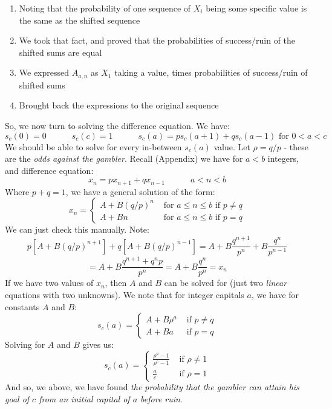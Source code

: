 \documentclass[12pt,a4paper]{article}
\newcommand{\1}[1]{\mathbbm{1}\left\{ #1 \right\}}
\begin{document}
\begin{enumerate}
	\item Noting that the probability of one sequence of $X_i$ being some specific value is the same as the shifted sequence
	\item We took that fact, and proved that the probabilities of success/ruin of the shifted sums are equal
	\item We expressed $A_{a,n}$ as $X_1$ taking a value, times probabilities of success/ruin of shifted sums
	\item Brought back the expressions to the original sequence
\end{enumerate}
So, we now turn to solving the difference equation. We have:
$$
	s_c(0) = 0 \quad\quad\quad s_c(c) = 1 \quad\quad\quad
	s_c(a) = ps_c(a + 1) + qs_c(a - 1) \text{ for $0 < a < c$}
$$
We should be able to solve for every in-between $s_c(a)$ value. Let $\rho = q / p$ - these are the \textit{odds against the gambler}. Recall (Appendix) we have for $a < b$ integers, and difference equation:
$$
	x_n = p x_{n + 1} + q x_{n - 1} \quad\quad\quad a < n < b
$$
Where $p + q = 1$, we have a general solution of the form:
$$
	x_n = \begin{cases}
	A + B(q / p)^n & \text{ for $a \leq n \leq b$ if $p \neq q$}\\
	A + Bn & \text{ for $a \leq n \leq b$ if $p = q$}
	\end{cases}
$$
We can just check this manually. Note:
$$
	p \left[A + B(q / p)^{n + 1}\right] + q \left[A + B(q / p)^{n - 1}\right] =
	A + B \frac{q^{n+1}}{p^n} + B \frac{q^n}{p^{n-1}}
$$
$$
	= A + B \frac{q^{n+1} + q^np}{p^n} = A + B \frac{q^n}{p^n} = x_n
$$
If we have two values of $x_n$, then $A$ and $B$ can be solved for (just two \textit{linear} equations with two unknowns). We note that for integer capitals $a$, we have for constants $A$ and $B$:
$$
	s_c(a) = \begin{cases}
	A + B\rho^a & \text{ if $p \neq q$}\\
	A + Ba & \text{ if $p = q$}
	\end{cases}
$$
Solving for $A$ and $B$ gives us:
$$
	s_c(a) = \begin{cases}
	\frac{\rho^a - 1}{\rho^c - 1} & \text{ if $\rho \neq 1$}\\
	\frac{a}{c} & \text{ if $\rho = 1$}
	\end{cases}
$$
And so, we above, we have found \textit{the probability that the gambler can attain his goal of $c$ from an initial capital of $a$ before ruin}.
\end{document}
